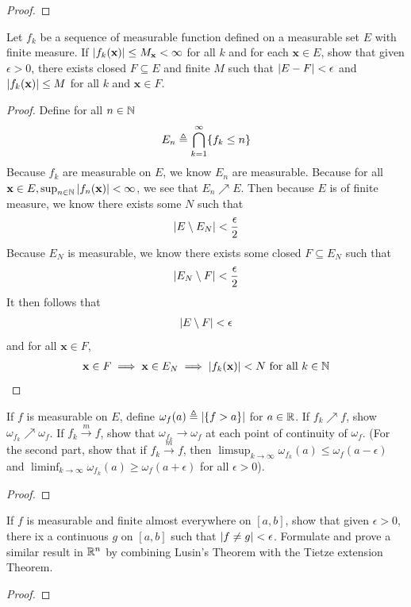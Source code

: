 \documentclass{report}
\begin{document}
\begin{proof}

\end{proof}
\begin{question}{}{}
Let $f_k$ be a sequence of measurable function defined on a measurable set  $E$ with finite measure. If  $\left|f_k(\textbf{x})\right|\leq M_{\textbf{x}}<\infty$ for all $k$ and for each  $\textbf{x} \in E$, show that given $\epsilon >0$, there exists closed $F\subseteq E$ and finite $M$ such that  $\left|E-F\right|< \epsilon $ and $\left|f_k(\textbf{x})\right|\leq M$ for all $k$ and  $\textbf{x}\in F$. 
\end{question}
\begin{proof}
Define for all $n\in\mathbb{N}$
\begin{align*}
E_n \triangleq \bigcap_{k=1}^{\infty} \{  f_k \leq n \}
\end{align*}
Because $f_k$ are measurable on $E$, we know $E_n$ are measurable. Because for all $\textbf{x} \in E, \sup_{n\in\mathbb{N}}\left|f_n(\textbf{x})\right|< \infty$, we see that $E_n \nearrow E$. Then because $E$ is of finite measure, we know there exists some  $N$ such that 
\begin{align*}
\left|E\setminus E_N\right|< \frac{\epsilon}{2}
\end{align*}
Because $E_N$ is measurable, we know there exists some closed $F\subseteq E_N$ such that 
\begin{align*}
\left|E_N\setminus F\right|< \frac{\epsilon}{2}
\end{align*}
It then follows that 
\begin{align*}
\left|E\setminus F\right|< \epsilon 
\end{align*}
and for all $\textbf{x} \in F$, 
\begin{align*}
\textbf{x} \in F \implies  \textbf{x}\in E_N\implies \left|f_k(\textbf{x})\right|<N\text{ for all }k\in\mathbb{N}
\end{align*}
\end{proof}
\begin{question}{}{}
If $f$ is measurable on $E$, define  $\omega_f(a)\triangleq \left|\{ f>a \}\right|$ for $a \in\mathbb{R}$. If $f_k\nearrow f$, show  $\omega_{f_k}\nearrow \omega_f$.  If $f_k \overset{m}{\to}f$, show that $\omega_{f_k}\to \omega_f$ at each point of continuity of $\omega_f$. (For the second part, show that if $f_k\overset{m}{\to}f$, then $\limsup_{k\to\infty}\omega_{f_k}(a)\leq \omega_f (a-\epsilon )$ and $\liminf_{k\to\infty} \omega_{f_k}(a)\geq \omega_f(a+\epsilon ) $ for all $\epsilon >0$). 
\end{question}
\begin{proof}

\end{proof}
\begin{question}{}{}
If $f$ is measurable and finite almost everywhere on $[a,b]$, show that given $\epsilon >0$, there ix a continuous $g$ on $[a,b]$ such that $\left|f\neq g\right|< \epsilon $. Formulate and prove a similar result in $\mathbb{R}^n$ by combining Lusin's Theorem with the Tietze extension Theorem. 
\end{question}
\begin{proof}

\end{proof}
\end{document}
